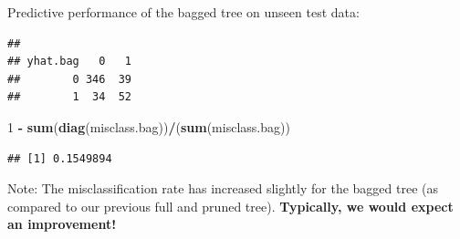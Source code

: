 \documentclass[10pt,ignorenonframetext,]{beamer}
\newenvironment{Shaded}{\begin{snugshade}}{\end{snugshade}}
\newcommand{\KeywordTok}[1]{\textcolor[rgb]{0.13,0.29,0.53}{\textbf{#1}}}
\newcommand{\DataTypeTok}[1]{\textcolor[rgb]{0.13,0.29,0.53}{#1}}
\newcommand{\DecValTok}[1]{\textcolor[rgb]{0.00,0.00,0.81}{#1}}
\newcommand{\StringTok}[1]{\textcolor[rgb]{0.31,0.60,0.02}{#1}}
\newcommand{\OperatorTok}[1]{\textcolor[rgb]{0.81,0.36,0.00}{\textbf{#1}}}
\newcommand{\NormalTok}[1]{#1}
\begin{document}
\begin{frame}[fragile]

Predictive performance of the bagged tree on unseen test data:

\scriptsize

\begin{Shaded}
\end{Shaded}

\begin{verbatim}
##         
## yhat.bag   0   1
##        0 346  39
##        1  34  52
\end{verbatim}

\begin{Shaded}
\begin{Highlighting}[]
\DecValTok{1} \OperatorTok{-}\StringTok{ }\KeywordTok{sum}\NormalTok{(}\KeywordTok{diag}\NormalTok{(misclass.bag))}\OperatorTok{/}\NormalTok{(}\KeywordTok{sum}\NormalTok{(misclass.bag))}
\end{Highlighting}
\end{Shaded}

\begin{verbatim}
## [1] 0.1549894
\end{verbatim}

\normalsize

Note: The misclassification rate has increased slightly for the bagged
tree (as compared to our previous full and pruned tree).
\textbf{Typically, we would expect an improvement!}

\end{frame}
\end{document}
